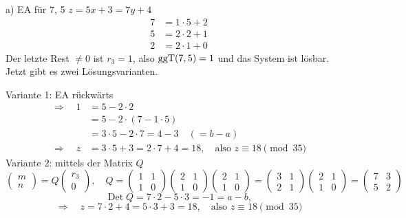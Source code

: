 \begin{loesung}
a) EA für 7, 5 \qquad $z = 5x + 3 = 7y + 4$
\begin{align*}
7 &= 1 \cdot 5 + 2\\
5 &= 2 \cdot 2 + 1\\
2 &= 2 \cdot 1 + 0
\end{align*}
Der letzte Rest $\neq 0$ ist $r_3 = 1$, also $\operatorname{ggT}(7, 5) = 1$ und das System ist lösbar. Jetzt gibt es zwei Lösungsvarianten.

Variante 1: EA rückwärts
\begin{align*}
\Rightarrow\quad 1 &= 5 - 2 \cdot 2\\
&= 5 - 2 \cdot (7 - 1 \cdot 5)\\
&= 3 \cdot 5 - 2 \cdot 7 = 4 - 3 \quad (= b - a)\\
\Rightarrow\quad z &= 3 \cdot 5 + 3 = 2 \cdot 7 + 4 = 18, \quad \text{also } z \equiv 18 \pmod{35}
\end{align*}
Variante 2: mittels der Matrix $Q$
\[
\begin{pmatrix} m \\ n \end{pmatrix} = Q \begin{pmatrix} r_3 \\ 0 \end{pmatrix}, \quad
Q = \begin{pmatrix} 1 & 1 \\ 1 & 0 \end{pmatrix}\begin{pmatrix} 2 & 1 \\ 1 & 0 \end{pmatrix}\begin{pmatrix} 2 & 1 \\ 1 & 0 \end{pmatrix}
= \begin{pmatrix} 3 & 1 \\ 2 & 1 \end{pmatrix}\begin{pmatrix} 2 & 1 \\ 1 & 0 \end{pmatrix}
= \begin{pmatrix} 7 & 3 \\ 5 & 2 \end{pmatrix}
\]
\[
\operatorname{Det} Q = 7 \cdot 2 - 5 \cdot 3 = -1 = a - b,
\]
\[
\Rightarrow\quad z = 7 \cdot 2 + 4 = 5 \cdot 3 + 3 = 18, \quad \text{also } z \equiv 18 \pmod{35}
\]


\end{loesung}
